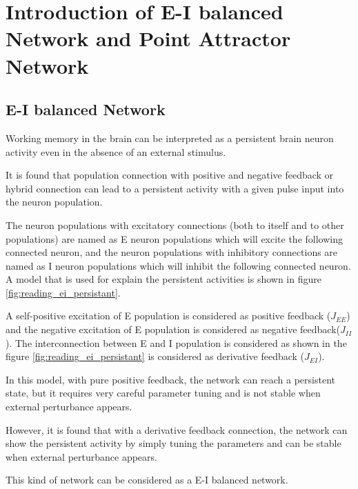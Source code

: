 \chapter{Introduction of E-I balanced Network and Point Attractor Network}\label{cpt:introduction}

\section{E-I balanced Network}
Working memory in the brain can be interpreted as a persistent brain neuron activity even in the absence of an external stimulus.

It is found that population connection with positive and negative feedback or hybrid connection can lead to a persistent activity with a given pulse input into the neuron population.

The neuron populations with excitatory connections (both to itself and to other populations) are named as E neuron populations which will excite the following connected neuron, and the neuron populations with inhibitory connections are named as I neuron populations which will inhibit the following connected neuron. A model that is used for explain the persistent activities is shown in figure \ref{fig:reading_ei_persistant}.

A self-positive excitation of E population is considered as positive feedback ($J_{EE}$) and 
the negative excitation of E population is considered as negative feedback($J_{II}$). 
The interconnection between E and I population is considered as shown in the figure \ref{fig:reading_ei_persistant} is considered as derivative feedback ($J_{EI}$)\cite{limBalancedCorticalMicrocircuitry2013}. 

In this model, with pure positive feedback, the network can reach a persistent state, but it requires very careful parameter tuning and is not stable when external perturbance appears.

However, it is found that with a derivative feedback connection, the network can show the persistent activity by simply tuning the parameters and can be stable when external perturbance appears.

This kind of network can be considered as a E-I balanced network. 


